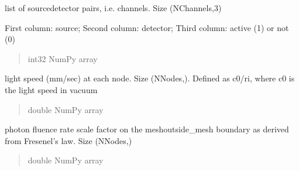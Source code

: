 \documentclass[letterpaper,10pt,english]{sphinxmanual}
\begin{document}
\begin{fulllineitems}
\begin{fulllineitems}
\begin{quote}
\begin{description}
\end{description}\end{quote}

\end{fulllineitems}


\begin{fulllineitems}
\label{\detokenize{_autosummary/nirfasterff.base.dcs_mesh.dcsmesh:nirfasterff.base.dcs_mesh.dcsmesh.link}}
\pysigstartsignatures
{}
\pysigstopsignatures
\sphinxAtStartPar
list of source\sphinxhyphen{}detector pairs, i.e. channels. Size (NChannels,3)

\sphinxAtStartPar
First column: source; Second column: detector; Third column: active (1) or not (0)
\begin{quote}\begin{description}
\sphinxAtStartPar
int32 NumPy array

\end{description}\end{quote}

\end{fulllineitems}


\begin{fulllineitems}
\label{\detokenize{_autosummary/nirfasterff.base.dcs_mesh.dcsmesh:nirfasterff.base.dcs_mesh.dcsmesh.c}}
\pysigstartsignatures
{}
\pysigstopsignatures
\sphinxAtStartPar
light speed (mm/sec) at each node.  Size (NNodes,). Defined as c0/ri, where c0 is the light speed in vacuum
\begin{quote}\begin{description}
\sphinxAtStartPar
double NumPy array

\end{description}\end{quote}

\end{fulllineitems}


\begin{fulllineitems}
\label{\detokenize{_autosummary/nirfasterff.base.dcs_mesh.dcsmesh:nirfasterff.base.dcs_mesh.dcsmesh.ksi}}
\pysigstartsignatures
{}
\pysigstopsignatures
\sphinxAtStartPar
photon fluence rate scale factor on the mesh\sphinxhyphen{}outside\_mesh boundary as derived from Fresenel’s law. Size (NNodes,)
\begin{quote}\begin{description}
\sphinxAtStartPar
double NumPy array


\end{description}
\end{quote}
\end{fulllineitems}
\end{fulllineitems}
\end{document}
